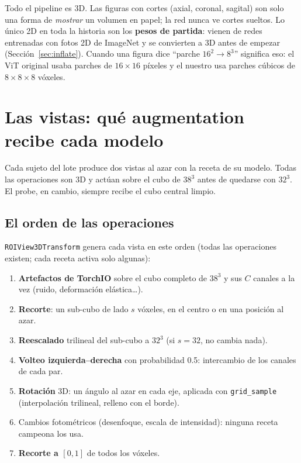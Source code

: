 \documentclass[11pt,a4paper]{article}
\begin{document}
\begin{warnbox}
Todo el pipeline es 3D. Las figuras con cortes (axial, coronal, sagital) son solo una forma de
\emph{mostrar} un volumen en papel; la red nunca ve cortes sueltos. Lo único 2D en toda la historia
son los \textbf{pesos de partida}: vienen de redes entrenadas con fotos 2D de ImageNet y se
convierten a 3D antes de empezar (Sección~\ref{sec:inflate}). Cuando una figura dice
``parche $16^2\rightarrow8^3$'' significa eso: el ViT original usaba parches de $16\times16$
píxeles y el nuestro usa parches cúbicos de $8\times8\times8$ vóxeles.
\end{warnbox}

\section{Las vistas: qué augmentation recibe cada modelo}
\label{sec:views}

\begin{tldrbox}
Cada sujeto del lote produce dos vistas al azar con la receta de su modelo. Todas las operaciones
son 3D y actúan sobre el cubo de $38^3$ antes de quedarse con $32^3$. El probe, en cambio, siempre
recibe el cubo central limpio.
\end{tldrbox}

\subsection{El orden de las operaciones}

\texttt{ROIView3DTransform} genera cada vista en este orden (todas las operaciones existen; cada
receta activa solo algunas):
\begin{enumerate}
\item \textbf{Artefactos de TorchIO} sobre el cubo completo de $38^3$ y sus $C$ canales a la vez
  (ruido, deformación elástica\ldots).
\item \textbf{Recorte}: un sub-cubo de lado $s$ vóxeles, en el centro o en una posición al azar.
\item \textbf{Reescalado} trilineal del sub-cubo a $32^3$ (si $s=32$, no cambia nada).
\item \textbf{Volteo izquierda--derecha} con probabilidad 0.5: intercambio de los canales de cada par.
\item \textbf{Rotación} 3D: un ángulo al azar en cada eje, aplicada con \texttt{grid\_sample}
  (interpolación trilineal, relleno con el borde).
\item Cambios fotométricos (desenfoque, escala de intensidad): ninguna receta campeona los usa.
\item \textbf{Recorte a $[0,1]$} de todos los vóxeles.
\end{enumerate}
\end{document}
